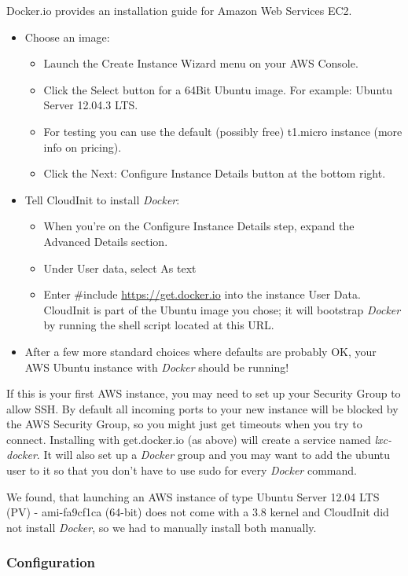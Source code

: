 \documentclass[captions=tableheading]{article}
\begin{document}
Docker.io provides an installation guide for Amazon Web Services EC2.
\begin{itemize}
\item Choose an image:
\begin{itemize}
\item Launch the Create Instance Wizard menu on your AWS Console.
\item Click the Select button for a 64Bit Ubuntu image. For example: Ubuntu Server 12.04.3 LTS.
\item For testing you can use the default (possibly free) t1.micro instance (more info on pricing).
\item Click the Next: Configure Instance Details button at the bottom right.
\end{itemize}
\item Tell CloudInit to install \emph{Docker}:
\begin{itemize}
\item When you're on the Configure Instance Details step, expand the Advanced Details section.
\item Under User data, select As text
\item Enter \#include \href{https://get.docker.io}{https://get.docker.io}  into the instance User Data. CloudInit is part of the Ubuntu image you chose; it will bootstrap \emph{Docker} by running the shell script located at this URL.
\end{itemize}
\item After a few more standard choices where defaults are probably OK, your AWS Ubuntu instance with \emph{Docker} should be running!
\end{itemize}
If this is your first AWS instance, you may need to set up your Security Group to allow SSH. By default all incoming ports to your new instance will be blocked by the AWS Security Group, so you might just get
timeouts when you try to connect. Installing with get.docker.io (as above) will create a service named \emph{lxc-docker}. It will also set up a \emph{Docker} group and you may want to add the ubuntu user to it so that you don't have to use sudo for every \emph{Docker} command. 

We found, that launching an AWS instance of type Ubuntu Server 12.04 LTS (PV) - ami-fa9cf1ca (64-bit) does not come with a 3.8 kernel and CloudInit did not install \emph{Docker}, so we had to manually install both manually.   
\subsubsection{Configuration}
\label{sec-2-1-5}
\end{document}
